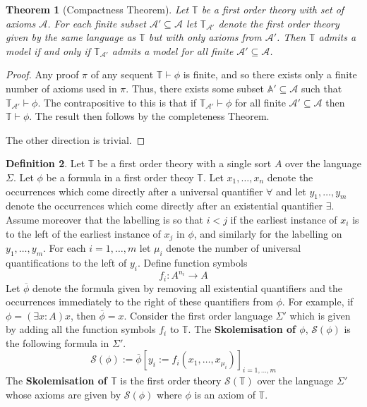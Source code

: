 \documentclass[12pt]{article}
\theoremstyle{plain}
\newtheorem{thm}{Theorem}[subsection] %
\theoremstyle{definition}
\newtheorem{defn}[thm]{Definition} %
\newcommand{\bb}[1]{\mathbb{#1}}
\newcommand{\call}[1]{\mathcal{#1}}
\newcommand{\lto}{\longrightarrow}
\begin{document}
	\begin{thm}[Compactness Theorem]
		Let $\bb{T}$ be a first order theory with set of axioms $\call{A}$. For each finite subset $\call{A}' \subseteq \call{A}$ let $\bb{T}_{\call{A}'}$ denote the first order theory given by the same language as $\bb{T}$ but with only axioms from $\call{A}'$. Then $\bb{T}$ admits a model if and only if $\bb{T}_{\call{A}'}$ admits a model for all finite $\call{A}' \subseteq \call{A}$.
		\end{thm}
	\begin{proof}
		Any proof $\pi$ of any sequent $\bb{T} \vdash \phi$ is finite, and so there exists only a finite number of axioms used in $\pi$. Thus, there exists some subset $\bb{A}' \subseteq \call{A}$ such that $\bb{T}_{\call{A}'} \vdash \phi$. The contrapositive to this is that if $\bb{T}_{\call{A}'} \vdash \phi$ for all finite $\call{A}' \subseteq \call{A}$ then $\bb{T} \vdash \phi$. The result then follows by the completeness Theorem.
		
		The other direction is trivial.
		\end{proof}
	
	\begin{defn}\label{def:skolemisation}
		Let $\bb{T}$ be a first order theory with a single sort $A$ over the language $\Sigma$. Let $\phi$ be a formula in a first order theoy $\bb{T}$. Let $x_1,\ldots, x_n$ denote the occurrences which come directly after a universal quantifier $\forall$ and let $y_1, \ldots, y_m$ denote the occurrences which come directly after an existential quantifier $\exists$. Assume moreover that the labelling is so that $i < j$ if the earliest instance of $x_i$ is to the left of the earliest instance of $x_j$ in $\phi$, and similarly for the labelling on $y_1, \ldots, y_m$. For each $i = 1,\ldots, m$ let $\mu_i$ denote the number of universal quantifications to the left of $y_i$. Define function symbols
		\begin{equation}
			f_{i}: A^{n_i} \lto A
			\end{equation}
		Let $\overline{\phi}$ denote the formula given by removing all existential quantifiers and the occurrences immediately to the right of these quantifiers from $\phi$. For example, if $\phi = (\exists x:A) x$, then $\overline{\phi} = x$. Consider the first order language $\Sigma'$ which is given by adding all the function symbols $f_i$ to $\bb{T}$. The \textbf{Skolemisation of $\phi$}, $\call{S}(\phi)$ is the following formula in $\Sigma'$.
		\begin{equation}
			\call{S}(\phi) := \overline{\phi}[y_i := f_i(x_1,\ldots, x_{\mu_i})]_{i = 1,\ldots, m}
			\end{equation}
		The \textbf{Skolemisation of $\bb{T}$} is the first order theory $\call{S}(\bb{T})$ over the language $\Sigma'$ whose axioms are given by $\call{S}(\phi)$ where $\phi$ is an axiom of $\bb{T}$.
		\end{defn}
	
\end{document}
